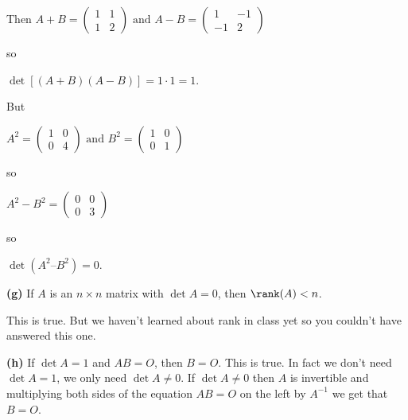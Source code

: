 \documentclass[oneside,12pt]{amsart}
\begin{document}
Then
$A+B=
\begin{pmatrix}
1 & 1 \\
1 & 2
\end{pmatrix}
\text{ and }
A-B=
\begin{pmatrix}
1 & -1 \\
-1 & 2
\end{pmatrix}
$

so

$\det[(A + B)(A-B)] = 1 \cdot 1 = 1$.

But

$A^2=
\begin{pmatrix}
1 & 0 \\
0 & 4
\end{pmatrix}
\text{ and }
B^2=
\begin{pmatrix}
1 & 0 \\
0 & 1
\end{pmatrix}
$

so

$
A^2 - B^2=
\begin{pmatrix}
0 & 0 \\
0 & 3
\end{pmatrix}
$

so

$\det( A^2 – B^2) = 0$.

\bigskip

\textbf{(g)} If $A$ is an $n \times n$ matrix with $\det A = 0$, then $\rank(A) < n$.

This is true. But we haven't learned about rank in class yet so you couldn't have answered this one.

\bigskip

\textbf{(h)} If $\det A = 1$ and $AB = O$, then $B = O$. This is true. In fact we
don't need $\det A = 1$, we only need $\det A \not= 0$. If $\det A \not= 0$ then
$A$ is invertible and multiplying both sides of the equation $AB = O$ on the left
by $A^{-1}$ we get that $B = O$.
\end{document}
